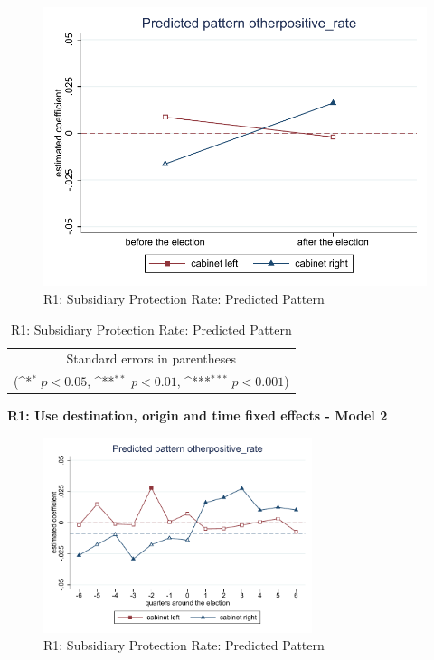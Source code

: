 \documentclass[10pt,a4paper]{scrartcl}
\begin{document}
\begin{figure}[!ht]
	\centering
	\includegraphics[width=1\textwidth]{figures_edited/otherpositive_rate_graph1_R1.pdf}
	\caption{R1: Subsidiary Protection Rate: Predicted Pattern}
\end{figure}

\begin{table}[!ht]\centering
	\renewcommand{\arraystretch}{1.25}
	\def\sym#1{\ifmmode^{#1}\else\(^{#1}\)\fi}
	\caption{R1: Subsidiary Protection Rate: Predicted Pattern}
	\begin{tabular}{l*{2}{c}}
		\hline\hline
		
		\hline\hline
		\multicolumn{3}{c}{\footnotesize Standard errors in parentheses} \\
		\multicolumn{3}{c}{\footnotesize (\sym{*} \(p<0.05\), \sym{**} \(p<0.01\), \sym{***} \(p<0.001\))}\\
	\end{tabular}
\end{table}

\clearpage
\textbf{ R1: Use destination, origin and time fixed effects - Model 2}
\begin{figure}[!ht]
	\centering
	\includegraphics[width=0.7\textwidth]{figures_edited/otherpositive_rate_graph2_R1.pdf}
	\caption{R1: Subsidiary Protection Rate: Predicted Pattern}
\end{figure}
\end{document}
